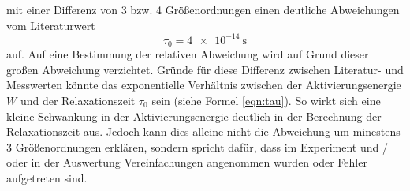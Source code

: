 mit einer Differenz von 3 bzw. 4 Größenordnungen einen deutliche Abweichungen vom Literaturwert \cite{V48a}
\begin{equation*}
  \tau_0 = \SI{4e-14}{\second}
\end{equation*}
auf.
Auf eine Bestimmung der relativen Abweichung wird auf Grund dieser großen Abweichung verzichtet.
Gründe für diese Differenz zwischen Literatur- und Messwerten könnte das exponentielle Verhältnis zwischen
der Aktivierungsenergie $W$ und der Relaxationszeit $\tau_0$ sein (siehe Formel \ref{eqn:tau}).
So wirkt sich eine kleine Schwankung in der Aktivierungsenergie deutlich in der Berechnung der Relaxationszeit
aus.
Jedoch kann dies alleine nicht die Abweichung um minestens 3 Größenordnungen erklären, sondern spricht dafür, dass
im Experiment und / oder in der Auswertung Vereinfachungen angenommen wurden oder Fehler aufgetreten sind.
